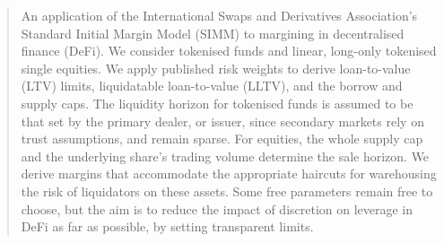 \begin{abstract}
 An application of the International Swaps and Derivatives Association's Standard Initial Margin Model (SIMM) to margining in decentralised finance (DeFi). We consider tokenised funds and linear, long-only tokenised single equities. We apply published risk weights to derive loan-to-value (LTV) limits, liquidatable loan-to-value (LLTV), and the borrow and supply caps. The liquidity horizon for tokenised funds is assumed to be that set by the primary dealer, or issuer, since secondary markets rely on trust assumptions, and remain sparse. For equities, the whole supply cap and the underlying share's trading volume determine the sale horizon. We derive margins that accommodate the appropriate haircuts for warehousing the risk of liquidators on these assets. Some free parameters remain free to choose, but the aim is to reduce the impact of discretion on leverage in DeFi as far as possible, by setting transparent limits.
\end{abstract}
